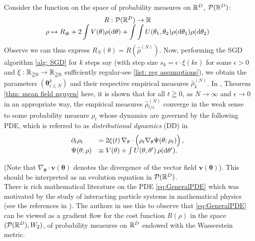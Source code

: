 \documentclass{article}
\begin{document}
Consider the function on the space of probability measures on $ \mathbb{R}^{D}$, $  \mathcal{P}(\mathbb{R}^{D})$:
\[
\begin{array}{cc}
    R: \mathcal{P}(\mathbb{R}^{D})\to \mathbb{R} \\ 
    \rho \mapsto R_{\#}+ 2 \displaystyle\int V( \mathbf{\theta}) \rho( \operatorname{d}\! \mathbf{\theta}) + \displaystyle \int\int U( \mathbf{\theta}_{1}, \mathbf{\theta}_{2}) \rho( \operatorname{d}\! \mathbf{\theta}_{1}) \rho( \operatorname{d}\! \mathbf{\theta}_{2})   
\end{array}
\]
Observe we can thus express $ R_{N}(\mathbb{\theta}) = R(\hat{\rho}^{(N)})$. Now, performing the SGD algorithm \ref{alg: SGD} for $ k$ steps say (with step size $ s_k = \epsilon\cdot \xi(k \epsilon)$ for some $ \epsilon >0$ and $ \xi: \mathbb{R}_{\geqq 0}\to \mathbb{R}_{\geqq 0}$ sufficiently regular-see \ref{list: reg assumptions}), we obtain the parameters $  (\mathbf{\theta}^{k}_{i\leq N})$ and their respective empirical measures $ \hat{\rho}^{(N)}_k$. In \cite{Mei_2018}, Theorem \ref{thm: mean field nguyen} here, it is shown that for all $ t\geqq 0$, as $ N\to \infty$ and $ \epsilon \to 0$ in an appropriate way, the empirical measures $ \hat{\rho}^{(N)}_{t/\epsilon}$ converge in the weak sense to some probability measure $ \rho_t$ whose dynamics are governed by the following PDE, which is referred to as \emph{distributional dynamics} (DD) in \cite{Mei_2018}
\begin{equation}
	\begin{array}{ll}
\partial_t \rho_t & =2\xi(t)\, \nabla_{ \mathbf{\theta}}\cdot \Big(\rho_t \nabla_{ \mathbf{\theta}}\Psi( \mathbf{\theta};\rho_t)\Big)\, ,\label{eq:GeneralPDE}\\
\Psi( \mathbf{\theta};\rho) & \equiv V( \mathbf{ \theta})+\int U( \mathbf{\theta}, \mathbf{\theta}')\, \rho(\operatorname{d}\!  \mathbf{\theta}') .
\end{array}
\end{equation}

(Note that $\nabla_{ \mathbf{\theta}}\cdot \mathbf{v}( \mathbf{\theta})$ denotes the divergence of the vector field $ \mathbf{v}( \mathbf{\theta})$). This should  be interpreted as an evolution equation in $ \mathcal{P}(\mathbb{R}^D)$.\\

There is rich mathematical literature on the PDE \ref{eq:GeneralPDE} which was
motivated by the study of interacting particle systems in mathematical physics (see the references in \cite{Mei_2018}). The authors in \cite{Mei_2018} use this to observe that \ref{eq:GeneralPDE} can be viewed as a gradient flow for the cost function $R(\rho)$ in the space 
$( \mathcal{P}(\mathbb{R}^D),W_2)$, of probability measures on $\mathbb{R}^D$
endowed with the Wasserstein metric.\\
\end{document}
